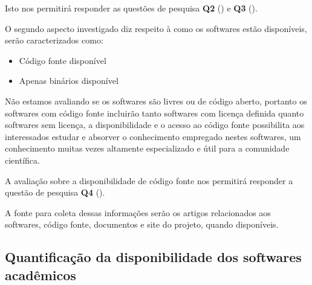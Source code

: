 Isto nos permitirá responder as questões de pesquisa {\bf Q2} (\QuestaoDois)
e {\bf Q3} (\QuestaoTres).


O segundo aspecto investigado diz respeito à como os softwares estão disponíveis,
serão caracterizados como:

\begin{itemize}
  \item Código fonte disponível
  \item Apenas binários disponível
\end{itemize}

%
%

Não estamos avaliando se os softwares são livres ou de código aberto, portanto
os softwares com código fonte incluirão tanto softwares com licença definida
quanto softwares sem licença, a disponibilidade e o acesso ao código fonte
possibilita aos interessados estudar e absorver o conhecimento empregado nestes
softwares, um conhecimento muitas vezes altamente especializado e útil para a
comunidade científica.

A avaliação sobre a disponibilidade de código fonte nos permitirá responder a questão de pesquisa
{\bf Q4} (\QuestaoQuatro).

A fonte para coleta dessas informações serão os artigos relacionados aos
softwares, código fonte, documentos e site do projeto, quando disponíveis.

\subsection{Quantificação da disponibilidade dos softwares acadêmicos}

